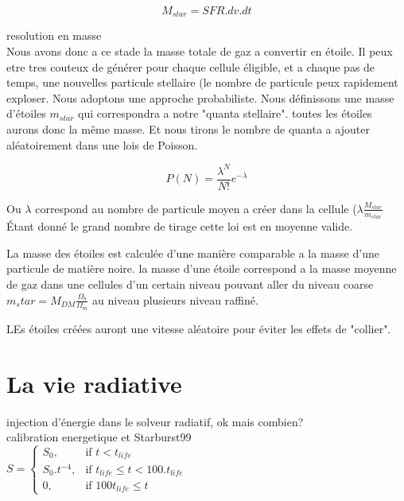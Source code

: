 \begin{equation}
	M_{star} = SFR . dv .dt 
\end{equation}

resolution en masse\\

Nous avons donc a ce stade la masse totale de gaz a convertir en étoile.
Il peux etre tres couteux de générer pour chaque cellule éligible, et a chaque pas de temps, une nouvelles particule stellaire (le nombre de particule peux rapidement exploser.
Nous adoptons une approche probabiliste.
Nous définissons une masse d'étoiles $m_{star}$ qui correspondra a notre "quanta stellaire".
toutes les étoiles aurons donc la même masse.
Et nous tirons le nombre de quanta a ajouter aléatoirement dans une lois de Poisson.

\begin{equation}
	P(N) = \frac{\lambda^N}{N!} e^{-\lambda}
\end{equation}

Ou $\lambda$ correspond au nombre de particule moyen a créer dans la cellule ($\lambda \frac{ M_{star}}{m_{star}}$
Étant donné le grand nombre de tirage cette loi est en moyenne valide.

La masse des étoiles est calculée d'une manière comparable a la masse d'une particule de matière noire.
la masse d'une étoile correspond a la masse moyenne de gaz dans une cellules d'un certain niveau pouvant aller du niveau coarse $m_star = M_{DM} \frac{\Omega_b}{\Omega_m}$ au niveau plusieurs niveau raffiné.


LEs étoiles créées auront une vitesse aléatoire pour éviter les effets de "collier".




\section{La vie radiative}

injection d'énergie dans le solveur radiatif, ok mais combien?\\
calibration energetique et Starburst99\\


$
    S = 
\begin{cases}
    S_0 ,         & \text{if } t < t_{life}\\
    S_0.t^{-4},   & \text{if } t_{life} \leq t < 100.t_{life} \\
    0,   & \text{if } 100t_{life} \leq t
\end{cases}
$


